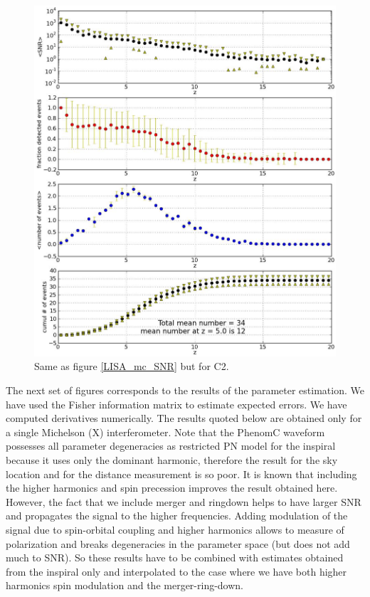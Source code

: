 \documentclass{iopart}
\begin{document}
\begin{figure}[H]
\center
   \includegraphics[width=1\textwidth]{FigSMBHPhenomAEI/C2_mc_SNRs.eps}
\caption{Same as figure \ref{LISA_mc_SNR} but for C2.
\label{C2_mc_SNR} } 
\end{figure}







The next set of figures corresponds to the results of the parameter estimation. We have used the Fisher information matrix 
to estimate expected errors. We have computed derivatives numerically. The results quoted below are obtained only for a single
Michelson (X) interferometer. Note that the PhenomC waveform possesses all parameter degeneracies as restricted PN 
model for the inspiral because it uses only the dominant harmonic, therefore the result for the sky location and for the 
distance measurement is so poor. It is known that including the higher harmonics and spin precession improves the 
result obtained here. However, the fact that we include merger and ringdown helps to have larger SNR  and  propagates the signal 
to the higher frequencies. Adding modulation of the signal due to spin-orbital coupling and higher harmonics allows 
to measure of polarization and breaks degeneracies in the parameter space (but does not add much to SNR). So these results 
have to be combined with estimates obtained from the inspiral only and interpolated to the case where we have both 
higher harmonics spin modulation and the merger-ring-down. 
\end{document}
